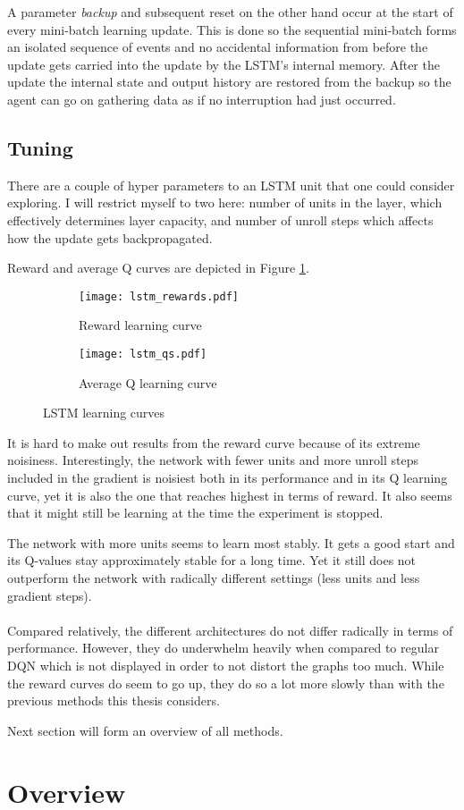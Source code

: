 A parameter \textit{backup} and subsequent reset
on the other hand
occur at the start of every mini-batch learning update.
This is done so the sequential mini-batch
forms an isolated sequence of events
and no accidental information from before the update gets carried into the update
by the LSTM's internal memory.
After the update
the internal state and output history
are restored from the backup
so the agent can go on gathering data
as if no interruption had just occurred.

\subsection{Tuning}
\label{sub:lstm_tuning}
There are a couple of hyper parameters to an LSTM unit
that one could consider exploring.
I will restrict myself to two here:
number of units in the layer,
which effectively determines layer capacity,
and number of unroll steps
which affects
how the update gets backpropagated.

Reward and average Q curves are depicted in Figure \ref{fig:lstm_both}.

\begin{figure}[htpb]
  \centering
  \begin{subfigure}[t]{.49\linewidth}
    \caption{Reward learning curve}
    \texttt{[image: lstm\_rewards.pdf]}
  \end{subfigure}
  \begin{subfigure}[t]{.49\linewidth}
    \caption{Average Q learning curve}
    \texttt{[image: lstm\_qs.pdf]}
  \end{subfigure}
  \caption{LSTM learning curves}
  \label{fig:lstm_both}
\end{figure}

It is hard to make out results from the reward curve because
of its extreme noisiness.
Interestingly,
the network with fewer units
and more unroll steps included in the gradient
is noisiest both in its performance
and in its Q learning curve,
yet it is also the one that reaches highest
in terms of reward.
It also seems that it might still be learning
at the time the experiment is stopped.

The network with more units seems to learn most stably.
It gets a good start and its Q-values stay approximately stable
for a long time.
Yet it still does not outperform
the network with radically different settings
(less units and less gradient steps).

\paragraph{}
Compared relatively,
the different architectures do not differ radically
in terms of performance.
However,
they do underwhelm heavily
when compared to regular DQN
which is not displayed in order to not distort the graphs too much.
While the reward curves do seem to go up,
they do so a lot more slowly
than with the previous methods
this thesis considers.

Next section will form an overview of all methods.

\section{Overview}
\label{sec:overview}


